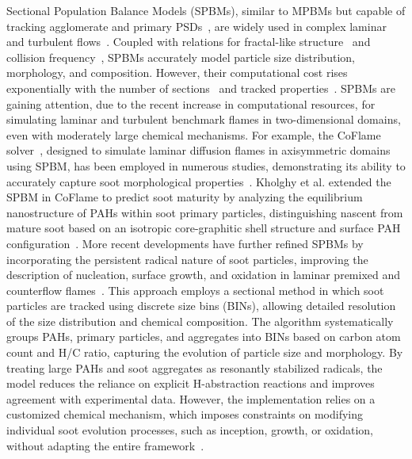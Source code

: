 Sectional Population Balance Models (SPBMs), similar to MPBMs but capable of tracking agglomerate and primary PSDs~\citep{Xiong1993}, are widely used in complex laminar~\citep{kholghy2016core} and turbulent flows~\citep{schiener2019transported}. Coupled with relations for fractal-like structure~\citep{matsoukas1991dynamics} and collision frequency~\citep{fuchs1964mechanics}, SPBMs accurately model particle size distribution, morphology, and composition. However, their computational cost rises exponentially with the number of sections~\citep{xiong1993formation} and tracked properties~\citep{kholghy2016core}.
SPBMs are gaining attention, due to the recent increase in computational resources, for simulating laminar and turbulent benchmark flames in two-dimensional domains, even with moderately large chemical mechanisms. For example, the CoFlame solver~\citep{eaves2016coflame}, designed to simulate laminar diffusion flames in axisymmetric domains using SPBM, has been employed in numerous studies, demonstrating its ability to accurately capture soot morphological properties~\citep{dworkin2011application, liu2015numerical}. Kholghy et al. extended the SPBM in CoFlame to predict soot maturity by analyzing the equilibrium nanostructure of PAHs within soot primary particles, distinguishing nascent from mature soot based on an isotropic core-graphitic shell structure and surface PAH configuration~\citep{kholghy2016core}. More recent developments have further refined SPBMs by incorporating the persistent radical nature of soot particles, improving the description of nucleation, surface growth, and oxidation in laminar premixed and counterflow flames~\citep{nobili2022modeling}. This approach employs a sectional method in which soot particles are tracked using discrete size bins (BINs), allowing detailed resolution of the size distribution and chemical composition. The algorithm systematically groups PAHs, primary particles, and aggregates into BINs based on carbon atom count and H/C ratio, capturing the evolution of particle size and morphology. By treating large PAHs and soot aggregates as resonantly stabilized radicals, the model reduces the reliance on explicit H-abstraction reactions and improves agreement with experimental data. However, the implementation relies on a customized chemical mechanism, which imposes constraints on modifying individual soot evolution processes, such as inception, growth, or oxidation, without adapting the entire framework~\citep{cuoci2015opensmoke++, cuoci2013computational}.




